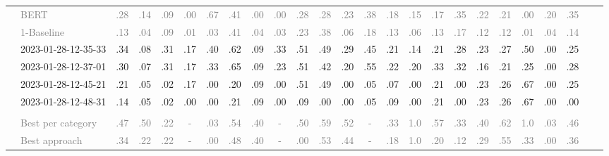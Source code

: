 \begin{table*}
\begin{tabular}{@{}ll@{\hspace{10pt}}c@{\hspace{5pt}}cccccccccccccccccccccc@{}}
& \textcolor{gray}{BERT} & \textcolor{gray}{.28} & \textcolor{gray}{.14} & \textcolor{gray}{.09} & \textcolor{gray}{.00} & \textcolor{gray}{.67} & \textcolor{gray}{.41} & \textcolor{gray}{.00} & \textcolor{gray}{.00} & \textcolor{gray}{.28} & \textcolor{gray}{.28} & \textcolor{gray}{.23} & \textcolor{gray}{.38} & \textcolor{gray}{.18} & \textcolor{gray}{.15} & \textcolor{gray}{.17} & \textcolor{gray}{.35} & \textcolor{gray}{.22} & \textcolor{gray}{.21} & \textcolor{gray}{.00} & \textcolor{gray}{.20} & \textcolor{gray}{.35} \\
& \textcolor{gray}{1-Baseline} & \textcolor{gray}{.13} & \textcolor{gray}{.04} & \textcolor{gray}{.09} & \textcolor{gray}{.01} & \textcolor{gray}{.03} & \textcolor{gray}{.41} & \textcolor{gray}{.04} & \textcolor{gray}{.03} & \textcolor{gray}{.23} & \textcolor{gray}{.38} & \textcolor{gray}{.06} & \textcolor{gray}{.18} & \textcolor{gray}{.13} & \textcolor{gray}{.06} & \textcolor{gray}{.13} & \textcolor{gray}{.17} & \textcolor{gray}{.12} & \textcolor{gray}{.12} & \textcolor{gray}{.01} & \textcolor{gray}{.04} & \textcolor{gray}{.14} \\
& 2023-01-28-12-35-33 & .34 & .08 & .31 & .17 & .40 & .62 & .09 & .33 & .51 & .49 & .29 & .45 & .21 & .14 & .21 & .28 & .23 & .27 & .50 & .00 & .25 \\
& 2023-01-28-12-37-01 & .30 & .07 & .31 & .17 & .33 & .65 & .09 & .23 & .51 & .42 & .20 & .55 & .22 & .20 & .33 & .32 & .16 & .21 & .25 & .00 & .28 \\
& 2023-01-28-12-45-21 & .21 & .05 & .02 & .17 & .00 & .20 & .09 & .00 & .51 & .49 & .00 & .05 & .07 & .00 & .21 & .00 & .23 & .26 & .67 & .00 & .25 \\
& 2023-01-28-12-48-31 & .14 & .05 & .02 & .00 & .00 & .21 & .09 & .00 & .09 & .00 & .00 & .05 & .09 & .00 & .21 & .00 & .23 & .26 & .67 & .00 & .00 \\
\addlinespace
\multicolumn{2}{@{}l}{\emph{New York Times}} \\
& \textcolor{gray}{Best per category} & \textcolor{gray}{.47} & \textcolor{gray}{.50} & \textcolor{gray}{.22} & \textcolor{gray}{-} & \textcolor{gray}{.03} & \textcolor{gray}{.54} & \textcolor{gray}{.40} & \textcolor{gray}{-} & \textcolor{gray}{.50} & \textcolor{gray}{.59} & \textcolor{gray}{.52} & \textcolor{gray}{-} & \textcolor{gray}{.33} & \textcolor{gray}{1.0} & \textcolor{gray}{.57} & \textcolor{gray}{.33} & \textcolor{gray}{.40} & \textcolor{gray}{.62} & \textcolor{gray}{1.0} & \textcolor{gray}{.03} & \textcolor{gray}{.46} \\
& \textcolor{gray}{Best approach} & \textcolor{gray}{.34} & \textcolor{gray}{.22} & \textcolor{gray}{.22} & \textcolor{gray}{-} & \textcolor{gray}{.00} & \textcolor{gray}{.48} & \textcolor{gray}{.40} & \textcolor{gray}{-} & \textcolor{gray}{.00} & \textcolor{gray}{.53} & \textcolor{gray}{.44} & \textcolor{gray}{-} & \textcolor{gray}{.18} & \textcolor{gray}{1.0} & \textcolor{gray}{.20} & \textcolor{gray}{.12} & \textcolor{gray}{.29} & \textcolor{gray}{.55} & \textcolor{gray}{.33} & \textcolor{gray}{.00} & \textcolor{gray}{.36} \\

\end{tabular}
\end{table*}
